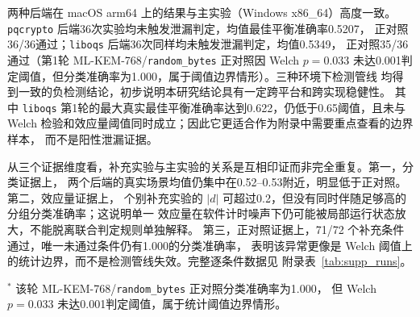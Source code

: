 \documentclass[a4paper,fontset=none]{ctexart}
\begin{document}
两种后端在 macOS arm64 上的结果与主实验（Windows x86\_64）高度一致。
\texttt{pqcrypto} 后端36次实验均未触发泄漏判定，均值最佳平衡准确率0.5207，
正对照36/36通过；\texttt{liboqs} 后端36次同样均未触发泄漏判定，均值0.5349，
正对照35/36通过（第1轮 ML-KEM-768/\texttt{random\_bytes} 正对照因 Welch $p=0.033$
未达0.001判定阈值，但分类准确率为1.000，属于阈值边界情形）。三种环境下检测管线
均得到一致的负检测结论，初步说明本研究结论具有一定跨平台和跨实现稳健性。
其中 \texttt{liboqs} 第1轮的最大真实最佳平衡准确率达到0.622，仍低于0.65阈值，且未与
Welch 检验和效应量阈值同时成立；因此它更适合作为附录中需要重点查看的边界样本，
而不是阳性泄漏证据。

从三个证据维度看，补充实验与主实验的关系是互相印证而非完全重复。第一，分类证据上，
两个后端的真实场景均值仍集中在0.52--0.53附近，明显低于正对照。第二，效应量证据上，
个别补充实验的 $|d|$ 可超过0.2，但没有同时伴随足够高的分组分类准确率；这说明单一
效应量在软件计时噪声下仍可能被局部运行状态放大，不能脱离联合判定规则单独解释。
第三，正对照证据上，71/72 个补充条件通过，唯一未通过条件仍有1.000的分类准确率，
表明该异常更像是 Welch 阈值上的统计边界，而不是检测管线失效。完整逐条件数据见
附录表~\ref{tab:supp_runs}。

\begin{table}[H]
  \centering
  \caption{macOS arm64 跨平台跨实现补充实验（3参数集$\times$4策略，每轮12次实验）}
  \label{tab:macos}
  \par\vspace{4pt}
  \raggedright\small $^{*}$ 该轮 ML-KEM-768/\texttt{random\_bytes} 正对照分类准确率为1.000，
  但 Welch $p=0.033$ 未达0.001判定阈值，属于统计阈值边界情形。
\end{table}
\end{document}
